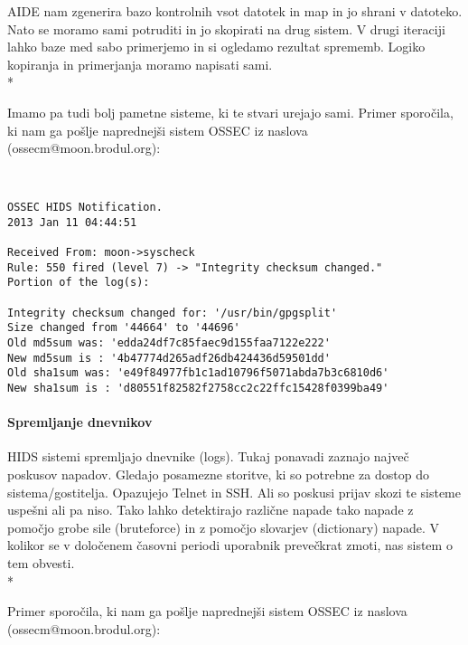 \documentclass[12pt]{article}
\begin{document}
AIDE nam zgenerira bazo kontrolnih vsot datotek in map in jo shrani v datoteko. Nato se moramo sami potruditi in jo skopirati na drug sistem. V drugi iteraciji lahko baze med sabo primerjemo in si ogledamo rezultat sprememb.
Logiko kopiranja in primerjanja moramo napisati sami.
\\*

Imamo pa tudi bolj pametne sisteme, ki te stvari urejajo sami.
Primer sporočila, ki nam ga pošlje naprednejši sistem OSSEC iz naslova (ossecm@moon.brodul.org):

\begin{verbatim}


OSSEC HIDS Notification.
2013 Jan 11 04:44:51

Received From: moon->syscheck
Rule: 550 fired (level 7) -> "Integrity checksum changed."
Portion of the log(s):

Integrity checksum changed for: '/usr/bin/gpgsplit'
Size changed from '44664' to '44696'
Old md5sum was: 'edda24df7c85faec9d155faa7122e222'
New md5sum is : '4b47774d265adf26db424436d59501dd'
Old sha1sum was: 'e49f84977fb1c1ad10796f5071abda7b3c6810d6'
New sha1sum is : 'd80551f82582f2758cc2c22ffc15428f0399ba49'

\end{verbatim}



\paragraph{Spremljanje dnevnikov} %

HIDS sistemi spremljajo dnevnike (logs). Tukaj ponavadi zaznajo največ poskusov napadov.
Gledajo posamezne storitve, ki so potrebne za dostop do sistema/gostitelja. Opazujejo Telnet in SSH.
Ali so poskusi prijav skozi te sisteme uspešni ali pa niso.
Tako lahko detektirajo različne napade tako napade z pomočjo grobe sile (bruteforce) in z pomočjo slovarjev (dictionary) napade.
V kolikor se v določenem časovni periodi uporabnik prevečkrat zmoti, nas sistem o tem obvesti.
\\*

Primer sporočila, ki nam ga pošlje naprednejši sistem OSSEC iz naslova (ossecm@moon.brodul.org):
\end{document}
